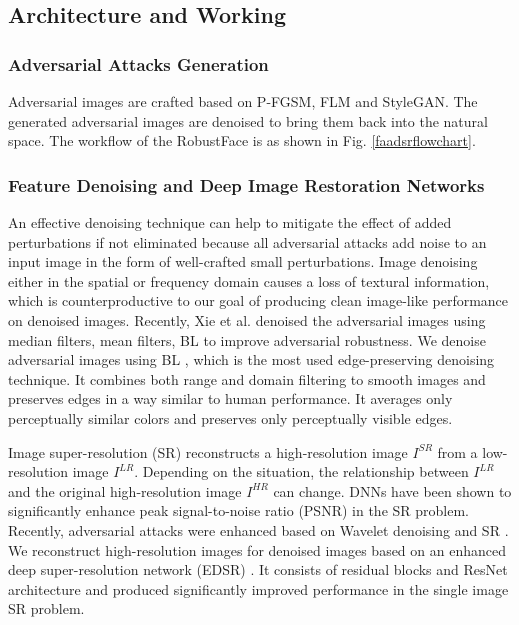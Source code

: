 \documentclass[sn-mathphys]{sn-jnl}%
\theoremstyle{thmstyleone}%
\theoremstyle{thmstyletwo}%
\theoremstyle{thmstylethree}%
\begin{document}

\subsection{Architecture and Working}
\subsubsection{Adversarial Attacks Generation}
Adversarial images are crafted based on P-FGSM, FLM and StyleGAN. The generated adversarial images are denoised to bring them back into the natural space. The workflow of the RobustFace is as shown in Fig. \ref{faadsrflowchart}.

\subsubsection{Feature Denoising and Deep Image Restoration Networks}
An effective denoising technique can help to mitigate the effect of added perturbations if not eliminated because all adversarial attacks add noise to an input image in the form of well-crafted small perturbations. Image denoising either in the spatial or frequency domain causes a loss of textural information, which is counterproductive to our goal of producing clean image-like performance on denoised images. Recently, Xie et al. \cite{xie2019feature} denoised the adversarial images using median filters, mean filters, BL to improve adversarial robustness. We denoise adversarial images using BL \cite{tomasi1998bilateral}, which is the most used edge-preserving denoising technique. It combines both range and domain filtering to smooth images and preserves edges in a way similar to human performance. It averages only perceptually similar colors and preserves only perceptually visible edges. 

Image super-resolution (SR) reconstructs a high-resolution image $I^{SR}$ from a low-resolution image $I^{LR}$. Depending on the situation, the relationship between $I^{LR}$ and the original high-resolution image $I^{HR}$ can change. DNNs \cite{kim2016accurate, kim2016deeply} have been shown to significantly enhance peak signal-to-noise ratio (PSNR) in the SR problem. Recently, adversarial attacks were enhanced based on Wavelet denoising and SR \cite{mustafa2019image}. We reconstruct high-resolution images for denoised images based on an enhanced deep super-resolution network (EDSR) \cite{lim2017enhanced}. It consists of residual blocks and ResNet architecture and produced significantly improved performance in the single image SR problem. 
\end{document}
